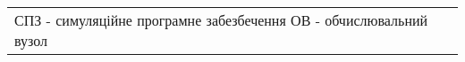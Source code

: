 
\begin{tabular}{l}
	СПЗ - симуляційне програмне забезбечення
	ОВ 	- обчислювальний вузол
\end{tabular}